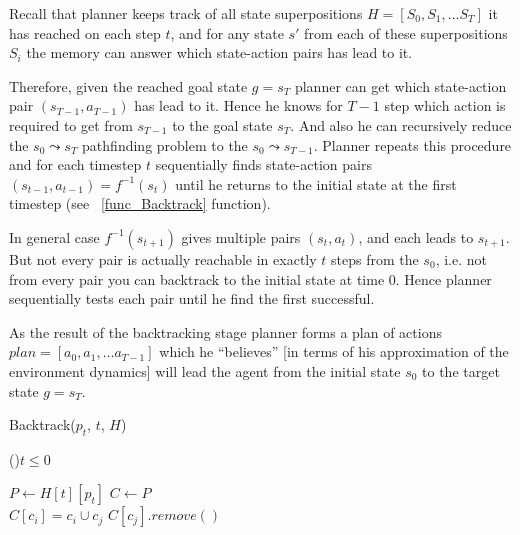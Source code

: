 \documentclass[runningheads]{llncs}
\begin{document}
Recall that planner keeps track of all state superpositions $H = [S_0, S_1, \dots S_T]$ it has reached on each step $t$, and for any state $s'$ from each of these superpositions $S_i$ the memory can answer which state-action pairs has lead to it.

Therefore, given the reached goal state $g = s_T$ planner can get which state-action pair $(s_{T-1}, a_{T-1})$ has lead to it. Hence he knows for $T-1$ step which action is required to get from $s_{T-1}$ to the goal state $s_T$. And also he can recursively reduce the $s_0 \leadsto s_T$ pathfinding problem to the  $s_0 \leadsto s_{T-1}$. Planner repeats this procedure and for each timestep $t$ sequentially finds state-action pairs $(s_{t-1}, a_{t-1}) = f^{-1}(s_t)$ until he returns to the initial state at the first timestep (see ~\ref{func_Backtrack} function).

In general case $f^{-1}(s_{t+1})$ gives multiple pairs $(s_t, a_t)$, and each leads to $s_{t+1}$. But not every pair is actually reachable in exactly $t$ steps from the $s_0$, i.e. not from every pair you can backtrack to the initial state at time $0$. Hence planner sequentially tests each pair until he find the first successful.

As the result of the backtracking stage planner forms a plan of actions $plan = [a_0, a_1, \dots a_{T-1}]$ which he ``believes'' [in terms of his approximation of the environment dynamics] will lead the agent from the initial state $s_0$ to the target state $g = s_T$.

\begin{function}
  \caption{Backtrack($p_t$, $t$, $H$)} \label{func_Backtrack}
  
  \If(){$t \leq 0$} {
  }{}

  $P \leftarrow H[t][p_t]$ 
  $C \leftarrow P$ 
  \quad \\

   {
    $C[c_i] = c_i \cup c_j$ \;
    $C[c_j].remove()$ \;
  }
  \quad \\


\end{function}
\end{document}
